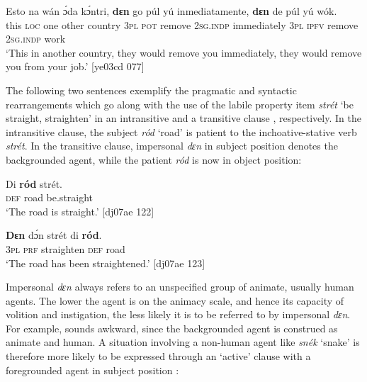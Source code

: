 \ea%
    \label{ex:key:1342}
    \gll Esto    na  wán    ɔ́da    kɔ́ntri,  \textbf{dɛn}  go  púl    yú    inmediatamente,
\textbf{dɛn}  de  púl    yú    wók.\\
this    \textsc{loc}  one    other  country  \textsc{3pl}  \textsc{pot}  remove  \textsc{2sg.indp}  immediately
\textsc{3pl}  \textsc{ipfv}  remove  \textsc{2sg.indp}  work\\

\glt ‘This in another country, they would remove you immediately, they
would remove you from your job.’ [ye03cd 077]
\z

The following two sentences exemplify the pragmatic and syntactic rearrangements which go along with the use of the labile property item \textit{strét} ‘be straight, straighten’ in an intransitive  and a transitive clause , respectively. In the intransitive clause, the subject \textit{ród} ‘road’ is patient to the inchoative-stative verb \textit{strét}. In the transitive clause, impersonal \textit{dɛn} in subject position denotes the backgrounded agent, while the patient \textit{ród} is now in object position: 


\ea%
    \label{ex:key:1343}
    \gll Di  \textbf{ród}    strét.\\
\textsc{def}  road    be.straight\\

\glt ‘The road is straight.’ [dj07ae 122]
\z


\ea%
    \label{ex:key:1344}
    \gll \textbf{Dɛn}    dɔ́n    strét    di  \textbf{ród}.\\
\textsc{3pl}    \textsc{prf}    straighten  \textsc{def}  road\\

\glt ‘The road has been straightened.’ [dj07ae 123]
\z

Impersonal \textit{dɛn} always refers to an unspecified group of animate, usually human agents. The lower the agent is on the animacy scale, and hence its capacity of volition and instigation, the less likely it is to be referred to by impersonal \textit{dɛn}. For example,  sounds awkward, since the backgrounded agent is construed as animate and human. A situation involving a non-human agent like \textit{snék} ‘snake’ is therefore more likely to be expressed through an ‘active’ clause with a foregrounded agent in subject position : 


\z


